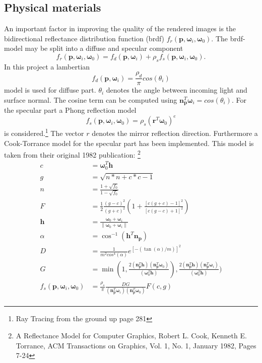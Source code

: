 \subsection{Physical materials}
An important factor in improving the quality of the rendered images is the bidirectional reflectance distribution function (brdf) $f_r(\mathbf{p},\mathbf{\omega}_i,\mathbf{\omega}_0)$. The brdf-model may be split into a diffuse and specular component
\begin{equation}
f_r(\mathbf{p},\mathbf{\omega}_i,\mathbf{\omega}_0) = f_d(\mathbf{p},\mathbf{\omega}_i) + \rho_s f_s(\mathbf{p},\mathbf{\omega}_i,\mathbf{\omega}_0).
\end{equation}
In this project a lambertian
\begin{equation}
f_d(\mathbf{p},\mathbf{\omega}_i) = \frac{\rho_d}{\pi} cos(\theta_i)
\end{equation}
model is used for diffuse part. $\theta_i$ denotes the angle between incoming light and surface normal. The cosine term can be computed using $\mathbf{n}_{\mathbf{p}}^T \mathbf{\omega}_i = cos(\theta_i)$.  
For the specular part a Phong reflection model 
\begin{equation}
f_s(\mathbf{p},\mathbf{\omega}_i,\mathbf{\omega}_0) = \rho_s (\mathbf{r}^T \mathbf{\omega}_0)^e
\end{equation}
is considered.\footnote{Ray Tracing from the ground up page 281} The vector $r$ denotes the mirror reflection direction.  Furthermore a Cook-Torrance model for the specular part has been implemented. This model is taken from their original 1982 publication: \footnote{A Reflectance Model for Computer Graphics, Robert L. Cook, Kenneth E. Torrance, ACM Transactions on Graphics, Vol. 1, No. 1, January 1982, Pages 7-24}
\begin{align}
c & = \mathbf{\omega}_0^T \mathbf{h} \\
g &=  \sqrt{n*n + c*c - 1} \\
n &= \frac{1 + \sqrt{f_0}}{1 - \sqrt{f_0}} \\
F &= \frac{1}{2} \frac{(g - c)^2}{(g + c)^2} (1 + \frac{[c (g + c) - 1]^2}{[c (g - c) + 1]^2}) \\
\mathbf{h} &= \frac{\mathbf{\omega}_0 + \mathbf{\omega}_i}{\| \mathbf{\omega}_0 + \mathbf{\omega}_i \|} \\
\alpha &= \cos^{-1}(\mathbf{h}^T \mathbf{n}_\mathbf{p}) \\
D &= \frac{1}{m^2 cos^4(\alpha)}e^{[-(\tan(\alpha)/m)]^2} \\
G &= \min(1,
     \frac{2 (\mathbf{n}_\mathbf{p}^T \mathbf{h})(\mathbf{n}_\mathbf{p}^T \mathbf{\omega}_0)  }{(\mathbf{\omega}_0^T \mathbf{h})}),
     \frac{2 (\mathbf{n}_\mathbf{p}^T \mathbf{h})(\mathbf{n}_\mathbf{p}^T \mathbf{\omega}_i)  }{(\mathbf{\omega}_0^T \mathbf{h})}) \\
f_s(\mathbf{p},\mathbf{\omega}_i,\mathbf{\omega}_0) &= \frac{\rho_s}{\pi}
 \frac{DG}{(\mathbf{n}_{\mathbf{p}}^T \mathbf{\omega}_i)(\mathbf{n}_{\mathbf{p}}^T \mathbf{\omega}_0)} F(c,g) \\
\end{align} 
